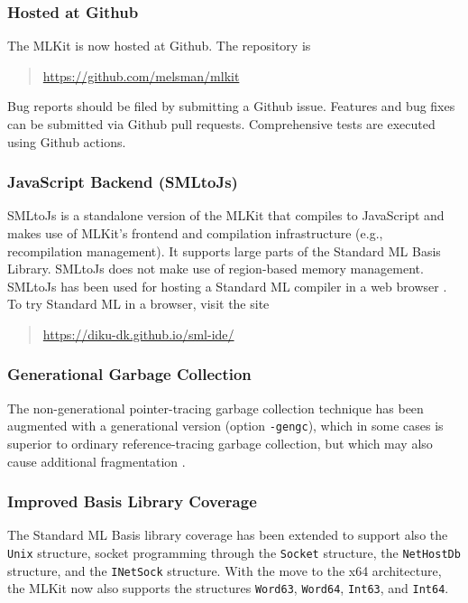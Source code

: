 \documentclass[12pt]{book}
\begin{document}
\subsubsection*{Hosted at Github}
%
%
%
%
The MLKit is now hosted at Github. The repository is
\begin{quote}
  \url{https://github.com/melsman/mlkit}
\end{quote}
%
%
%
%
Bug reports should be filed by submitting a Github issue. Features and
bug fixes can be submitted via Github pull requests. Comprehensive
tests are executed  using Github actions.

\subsubsection*{JavaScript Backend (SMLtoJs)}
%

SMLtoJs is a standalone version of the MLKit that compiles to
JavaScript and makes use of MLKit's frontend and compilation
infrastructure (e.g., recompilation management). It supports large
parts of the Standard ML Basis Library. SMLtoJs does not make use of
region-based memory management. SMLtoJs has been used for hosting a
Standard ML compiler in a web browser
\cite{10.1145/2093328.2093336}. To try Standard ML in a browser, visit
the site

\begin{quote}
\url{https://diku-dk.github.io/sml-ide/}
\end{quote}

\subsubsection*{Generational Garbage Collection}
%

The non-generational pointer-tracing garbage collection technique has
been augmented with a generational version (option \texttt{-gengc}),
which in some cases is superior to ordinary reference-tracing garbage
collection, but which may also cause additional fragmentation
\cite{elshaljfp21}.

\subsubsection*{Improved Basis Library Coverage}

The Standard ML Basis library coverage has been extended to support
also the \texttt{Unix} structure, socket programming through the
%
%
%
\texttt{Socket} structure, the \texttt{NetHostDb} structure, and the
\texttt{INetSock} structure. With the move to the x64 architecture,
the MLKit now also supports the structures \texttt{Word63},
\texttt{Word64}, \texttt{Int63}, and \texttt{Int64}.
\end{document}
